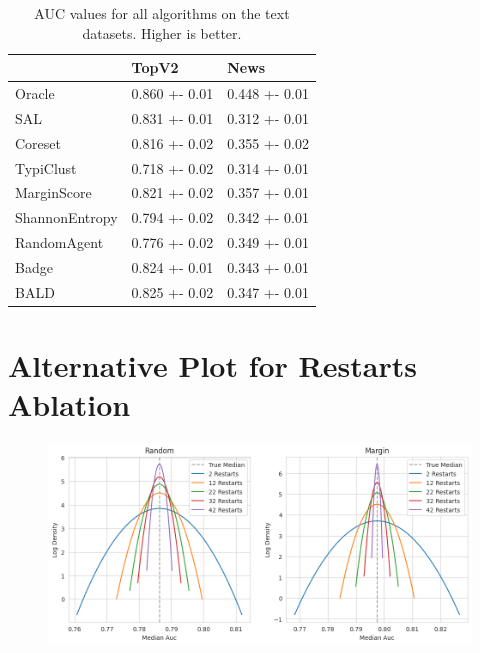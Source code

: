 \documentclass[]{article}
\begin{document}
%
\begin{table}[H]
	\begin{tabular}{l|ll}
		& TopV2         & News          \\
		\hline
		Oracle          & 0.860 +- 0.01 & 0.448 +- 0.01 \\
		SAL & 0.831 +- 0.01 & 0.312 +- 0.01 \\
		Coreset & 0.816 +- 0.02 & 0.355 +- 0.02 \\
		TypiClust       & 0.718 +- 0.02 & 0.314 +- 0.01 \\
		MarginScore     & 0.821 +- 0.02 & 0.357 +- 0.01 \\
		ShannonEntropy  & 0.794 +- 0.02 & 0.342 +- 0.01 \\
		RandomAgent     & 0.776 +- 0.02 & 0.349 +- 0.01 \\
		Badge           & 0.824 +- 0.01 & 0.343 +- 0.01 \\
		BALD            & 0.825 +- 0.02 & 0.347 +- 0.01
	\end{tabular}
\caption{AUC values for all algorithms on the text datasets. Higher is better.}
\end{table}

\section{Alternative Plot for Restarts Ablation}
\begin{figure}[H]
	\centering
	\includegraphics[width=\linewidth]{img/ablation_restarts_2.png}
\end{figure}
\end{document}
